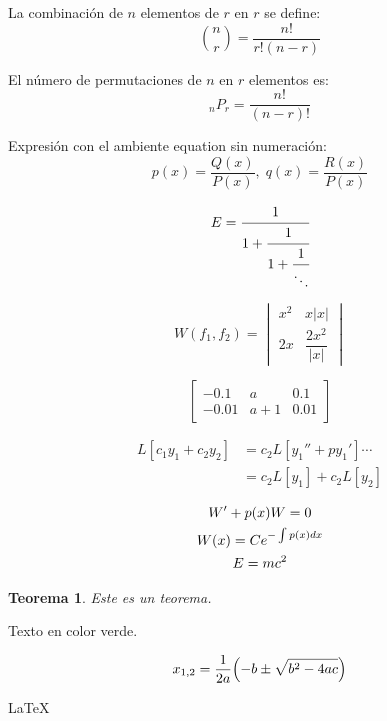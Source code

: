 \documentclass{article}     %
\newcommand{\cuadratica}{
    \begin{equation}
        x_{1,2} = \frac{1}{2a}\Bigl(-b\pm \sqrt{b^2 - 4ac}\Bigr)
    \end{equation}
}
\newtheorem{theorem}{Teorema}
\begin{document}
    La combinación de $n$ elementos de $r$ en $r$ se define:
    \[
    \binom{n}{r} = \frac{n!}{r!(n - r)}
    \]

    El número de permutaciones de $n$ en $r$ elementos es:
    \begin{equation}
    _nP_r = \frac{n!}{(n - r)!}
    \end{equation}

    Expresión con el ambiente equation sin numeración:
    \begin{equation*}
    p(x) = \frac{Q(x)}{P(x)},\; q(x) = \frac{R(x)}{P(x)}
    \end{equation*}

    \begin{equation*}
    E = \cfrac{1}{1 + \cfrac{1}{1 + \cfrac{1}{\ddots}}}
    \end{equation*}

    \[
        W(f_1, f_2) =
        \begin{vmatrix}
            x^2 & x|x| \\
            2x & \dfrac{2x^2}{|x|}
        \end{vmatrix}
    \]

    \[
        \left[
        \begin{array}{lcr}
            -0.1 & a & 0.1 \\
            -0.01 & a + 1 & 0.01
        \end{array}
        \right]
    \]

    \[
        \begin{split}
            L[c_1y_1 + c_2y_2] &= c_2L[y_1'' + py_1']\cdots \\
            &= c_2L[y_1] + c_2L[y_2]
        \end{split}
    \]

    \begin{gather}
        W' + p(x)W = 0 \\
        W(x) = Ce^{-\int p(x)dx} \notag \\
        E = mc^2
    \end{gather}

    \begin{theorem}
        Este es un teorema.
    \end{theorem}

    \textcolor{Verde}{Texto en color verde.}

    \cuadratica

    \Fourier[inLine]

    \LaTeX
\end{document}

